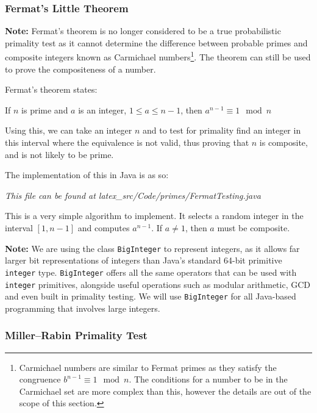     \subsubsection{Fermat's Little Theorem}
    \label{subsubsec:fermat}
    
    \textbf{Note:} Fermat's theorem is no longer considered to be a true probabilistic primality test as it cannot determine the difference between probable primes and composite integers known as Carmichael numbers\footnote{Carmichael numbers are similar to Fermat primes as they satisfy the congruence $b^{n-1} \equiv 1 \mod{n}$. The conditions for a number to be in the Carmichael set are more complex than this, however the details are out of the scope of this section.}. The theorem can still be used to prove the compositeness of a number.
    
    Fermat's theorem states:
    
    \begin{center}
      If $n$ is prime and $a$ is an integer, $1 \leq a \leq n - 1$, then
      $a^{n-1} \equiv 1 \mod{n}$
    \end{center}
    
    Using this, we can take an integer $n$ and to test for primality find an integer in this interval where the equivalence is not valid, thus proving that $n$ is composite, and is not likely to be prime.
    
    The implementation of this in Java is as so:
    
    \lstset{language=Java}
    
    
    \emph{This file can be found at latex\_src/Code/primes/FermatTesting.java}
    
    This is a very simple algorithm to implement. It selects a random integer in the interval $[1,n-1]$ and computes $a^{n-1}$. If $a \neq 1$, then $a$ must be composite.
    
    \textbf{Note:} We are using the class \verb!BigInteger! to represent integers, as it allows far larger bit representations of integers than Java's standard 64-bit primitive \verb!integer! type. \verb!BigInteger! offers all the same operators that can be used with \verb!integer! primitives, alongside useful operations such as modular arithmetic, GCD and even built in primality testing. We will use \verb!BigInteger! for all Java-based programming that involves large integers.
    
    \subsubsection{Miller--Rabin Primality Test}
    
